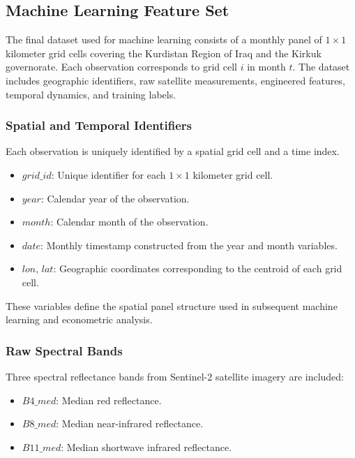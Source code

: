 \documentclass[12pt]{article}
\begin{document}
\subsection{Machine Learning Feature Set}

The final dataset used for machine learning consists of a monthly panel of $1 \times 1$ kilometer grid cells covering the Kurdistan Region of Iraq and the Kirkuk governorate. Each observation corresponds to grid cell $i$ in month $t$. The dataset includes geographic identifiers, raw satellite measurements, engineered features, temporal dynamics, and training labels.

\subsubsection{Spatial and Temporal Identifiers}

Each observation is uniquely identified by a spatial grid cell and a time index.

\begin{itemize}
\item $grid\_id$: Unique identifier for each $1 \times 1$ kilometer grid cell.
\item $year$: Calendar year of the observation.
\item $month$: Calendar month of the observation.
\item $date$: Monthly timestamp constructed from the year and month variables.
\item $lon$, $lat$: Geographic coordinates corresponding to the centroid of each grid cell.
\end{itemize}

These variables define the spatial panel structure used in subsequent machine learning and econometric analysis.

\subsubsection{Raw Spectral Bands}

Three spectral reflectance bands from Sentinel-2 satellite imagery are included:

\begin{itemize}
\item $B4\_med$: Median red reflectance.
\item $B8\_med$: Median near-infrared reflectance.
\item $B11\_med$: Median shortwave infrared reflectance.
\end{itemize}
\end{document}
